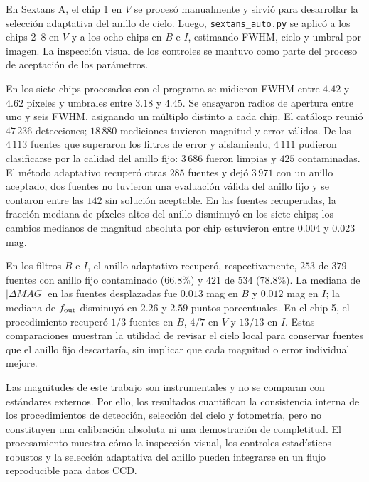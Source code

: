 \documentclass[12pt,letterpaper,oneside]{book}
\begin{document}
En Sextans A, el chip 1 en $V$ se procesó manualmente y sirvió para desarrollar la selección adaptativa del anillo de cielo. Luego, \texttt{sextans\_auto.py} se aplicó a los chips 2--8 en $V$ y a los ocho chips en $B$ e $I$, estimando FWHM, cielo y umbral por imagen. La inspección visual de los controles se mantuvo como parte del proceso de aceptación de los parámetros.

En los siete chips procesados con el programa se midieron FWHM entre $4.42$ y $4.62$ píxeles y umbrales entre $3.18$ y $4.45$. Se ensayaron radios de apertura entre uno y seis FWHM, asignando un múltiplo distinto a cada chip. El catálogo reunió $47\,236$ detecciones; $18\,880$ mediciones tuvieron magnitud y error válidos. De las $4\,113$ fuentes que superaron los filtros de error y aislamiento, $4\,111$ pudieron clasificarse por la calidad del anillo fijo: $3\,686$ fueron limpias y $425$ contaminadas. El método adaptativo recuperó otras $285$ fuentes y dejó $3\,971$ con un anillo aceptado; dos fuentes no tuvieron una evaluación válida del anillo fijo y se contaron entre las $142$ sin solución aceptable. En las fuentes recuperadas, la fracción mediana de píxeles altos del anillo disminuyó en los siete chips; los cambios medianos de magnitud absoluta por chip estuvieron entre $0.004$ y $0.023$ mag.

En los filtros $B$ e $I$, el anillo adaptativo recuperó, respectivamente, $253$ de $379$ fuentes con anillo fijo contaminado ($66.8\%$) y $421$ de $534$ ($78.8\%$). La mediana de $|\Delta MAG|$ en las fuentes desplazadas fue $0.013$ mag en $B$ y $0.012$ mag en $I$; la mediana de $f_{\rm out}$ disminuyó en $2.26$ y $2.59$ puntos porcentuales. En el chip 5, el procedimiento recuperó $1/3$ fuentes en $B$, $4/7$ en $V$ y $13/13$ en $I$. Estas comparaciones muestran la utilidad de revisar el cielo local para conservar fuentes que el anillo fijo descartaría, sin implicar que cada magnitud o error individual mejore.

Las magnitudes de este trabajo son instrumentales y no se comparan con estándares externos. Por ello, los resultados cuantifican la consistencia interna de los procedimientos de detección, selección del cielo y fotometría, pero no constituyen una calibración absoluta ni una demostración de completitud. El procesamiento muestra cómo la inspección visual, los controles estadísticos robustos y la selección adaptativa del anillo pueden integrarse en un flujo reproducible para datos CCD.

\vspace{5mm}
\end{document}
